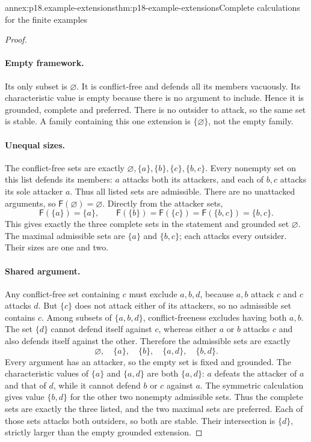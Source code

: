 \begin{annexitem}{annex:p18.example-extensions}{thm:p18-example-extensions}{Complete calculations for the finite examples}
\begin{proof}
\paragraph{Empty framework.}
Its only subset is \(\varnothing\). It is conflict-free and defends all
its members vacuously. Its characteristic value is empty because there is
no argument to include. Hence it is grounded, complete and preferred. There
is no outsider to attack, so the same set is stable. A family containing this
one extension is \(\{\varnothing\}\), not the empty family.

\paragraph{Unequal sizes.}
The conflict-free sets are exactly
\(\varnothing,\{a\},\{b\},\{c\},\{b,c\}\). Every nonempty set
on this list defends its members: \(a\) attacks both its attackers, and
each of \(b,c\) attacks its sole attacker \(a\). Thus all listed
sets are admissible. There are no unattacked arguments, so
\(\mathsf F(\varnothing)=\varnothing\). Directly from the attacker
sets,
\[
 \mathsf F(\{a\})=\{a\},\qquad
 \mathsf F(\{b\})=\mathsf F(\{c\})
   =\mathsf F(\{b,c\})=\{b,c\}.
\]
This gives exactly the three complete sets in the statement and grounded
set \(\varnothing\). The maximal admissible sets are \(\{a\}\) and
\(\{b,c\}\); each attacks every outsider. Their sizes are one and two.

\paragraph{Shared argument.}
Any conflict-free set containing \(c\) must exclude \(a,b,d\), because
\(a,b\) attack \(c\) and \(c\) attacks \(d\). But \(\{c\}\)
does not attack either of its attackers, so no admissible set contains \(c\).
Among subsets of \(\{a,b,d\}\), conflict-freeness excludes having both
\(a,b\). The set \(\{d\}\) cannot defend itself against \(c\),
whereas either \(a\) or \(b\) attacks \(c\) and also defends itself
against the other. Therefore the admissible sets are exactly
\[
 \varnothing,\quad\{a\},\quad\{b\},\quad\{a,d\},\quad\{b,d\}.
\]
Every argument has an attacker, so the empty set is fixed and grounded.
The characteristic values of \(\{a\}\) and \(\{a,d\}\) are both
\(\{a,d\}\): \(a\) defeats the attacker of \(a\) and that of
\(d\), while it cannot defend \(b\) or \(c\) against \(a\).
The symmetric calculation gives value \(\{b,d\}\) for the other two
nonempty admissible sets. Thus the complete sets are exactly the three
listed, and the two maximal sets are preferred. Each of those sets attacks
both outsiders, so both are stable. Their intersection is \(\{d\}\),
strictly larger than the empty grounded extension.
\end{proof}
\end{annexitem}
